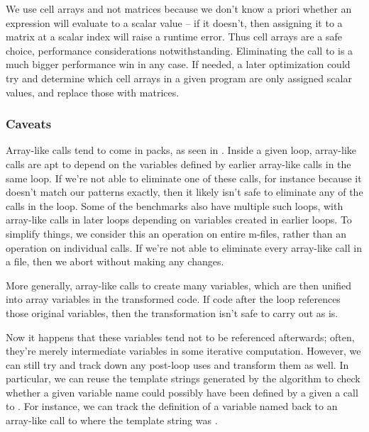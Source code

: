 We use cell arrays and not matrices because we don't know a priori whether an
expression will evaluate to a scalar value -- if it doesn't, then assigning it
to a matrix at a scalar index will raise a runtime error. Thus cell arrays are
a safe choice, performance considerations notwithstanding. Eliminating the call
to  is a much bigger performance win in any case. If needed, a later
optimization could try and determine which cell arrays in a given program are
only assigned scalar values, and replace those with matrices.

\subsubsection{Caveats}

Array-like calls tend to come in packs, as seen in .
Inside a given loop, array-like calls are apt to depend on the variables
defined by earlier array-like calls in the same loop. If we're not able to
eliminate one of these calls, for instance because it doesn't match our
patterns exactly, then it likely isn't safe to eliminate any of the calls in
the loop. Some of the benchmarks also have multiple such loops, with array-like
calls in later loops depending on variables created in earlier loops. To simplify
things, we consider this an operation on entire m-files, rather than an
operation on individual calls. If we're not able to eliminate every array-like
call in a file, then we abort without making any changes.

More generally, array-like calls to  create many variables, which
are then unified into array variables in the transformed code. If code after
the loop references those original variables, then the transformation isn't
safe to carry out as is.

Now it happens that these variables tend not to be referenced afterwards;
often, they're merely intermediate variables in some iterative computation.
However, we can still try and track down any post-loop uses and transform them
as well. In particular, we can reuse the template strings generated by the
algorithm to check whether a given variable name could possibly have been
defined by a given a call to . For instance, we can track the
definition of a variable named  back to an array-like call to
 where the template string was .

